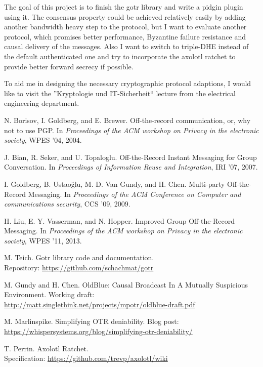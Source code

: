 \documentclass[10pt,a4paper]{article}
\begin{document}
The goal of this project is to finish the gotr library\cite{libgotr} and write a
pidgin plugin using it. The consensus property could be achieved relatively
easily by adding another bandwidth heavy step to the protocol, but I want to
evaluate another protocol\cite{oldblue}, which promises better performance,
Byzantine failure resistance and causal delivery of the messages. Also I want to
switch to triple-DHE\cite{tripledhe} instead of the default authenticated one
and try to incorporate the axolotl ratchet\cite{axolotl} to provide better
forward secrecy if possible.

To aid me in designing the necessary cryptographic protocol adaptions, I would
like to visit the ”Kryptologie und IT-Sicherheit“ lecture from the electrical
engineering department.

\begin{thebibliography}{xx}

	 N. Borisov, I. Goldberg, and E. Brewer. Off-the-record
		communication, or, why not to use PGP. In \textit{Proceedings of the ACM
		workshop on Privacy in the electronic society}, WPES ’04, 2004.

	 J. Bian, R. Seker, and U. Topaloglu. Off-the-Record Instant
		Messaging for Group Conversation. In \textit{Proceedings of Information
		Reuse and Integration}, IRI ’07, 2007.

	 I. Goldberg, B. Ustaoğlu, M. D. Van Gundy, and H. Chen.
		Multi-party Off-the-Record Messaging. In \textit{Proceedings of the ACM
		Conference on Computer and communications security}, CCS ’09, 2009.

	 H. Liu, E. Y. Vasserman, and N. Hopper. Improved Group
		Off-the-Record Messaging. In \textit{Proceedings of the ACM workshop on
		Privacy in the electronic society}, WPES ’11, 2013.

	 M. Teich.
		Gotr library code and documentation.\\Repository:
		\url{https://github.com/schachmat/gotr}

	 M. Gundy and H. Chen.
		OldBlue: Causal Broadcast In A Mutually Suspicious Environment.
		Working draft: \url{http://matt.singlethink.net/projects/mpotr/oldblue-draft.pdf}

	 M. Marlinspike.
		Simplifying OTR deniability. Blog post:
		\url{https://whispersystems.org/blog/simplifying-otr-deniability/}

	 T. Perrin.
		Axolotl Ratchet.\\Specification:
		\url{https://github.com/trevp/axolotl/wiki}

\end{thebibliography}
\end{document}
